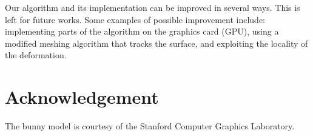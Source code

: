 \documentclass[ams]{U-AizuGT}
\begin{document}
Our algorithm and its implementation can be improved in several ways. This is left for future works.
Some examples of possible improvement include:  
implementing parts of the algorithm on the graphics card (GPU), using a modified meshing algorithm that tracks the surface, and exploiting the locality of the deformation. 


\section*{Acknowledgement}
The bunny model is courtesy of the Stanford Computer Graphics Laboratory.




\end{document}
